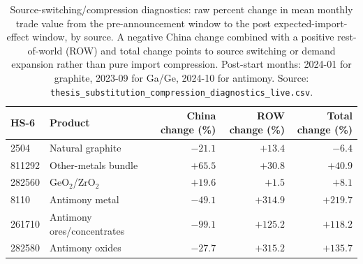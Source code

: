 \begin{table}[H]
\centering
\caption{Source-switching/compression diagnostics: raw percent change in mean
monthly trade value from the pre-announcement window to the post
expected-import-effect window, by source. A negative China change combined with a
positive rest-of-world (ROW) and total change points to source switching or
demand expansion rather than pure import compression. Post-start months: 2024-01
for graphite, 2023-09 for Ga/Ge, 2024-10 for antimony. Source:
\texttt{thesis\_substitution\_compression\_diagnostics\_live.csv}.}
\label{tab:subcompression}
\footnotesize
\begin{tabular}{llrrr}
\toprule
HS-6 & Product & China change (\%) & ROW change (\%) & Total change (\%) \\
\midrule
2504   & Natural graphite           & $-21.1$ & $+13.4$  & $-6.4$ \\
811292 & Other-metals bundle      & $+65.5$ & $+30.8$  & $+40.9$ \\
282560 & GeO$_2$/ZrO$_2$           & $+19.6$ & $+1.5$   & $+8.1$ \\
8110   & Antimony metal             & $-49.1$ & $+314.9$ & $+219.7$ \\
261710 & Antimony ores/concentrates & $-99.1$ & $+125.2$ & $+118.2$ \\
282580 & Antimony oxides            & $-27.7$ & $+315.2$ & $+135.7$ \\
\bottomrule
\end{tabular}
\end{table}
